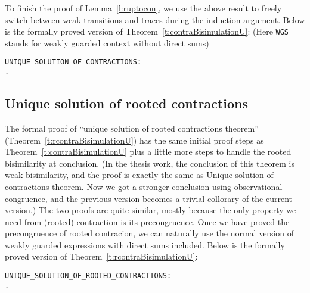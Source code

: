 To finish the proof of Lemma~\ref{l:ruptocon}, we use the  above
result to freely switch between weak transitions and traces
during the induction argument.
Below is the formally proved version of
Theorem~\ref{t:contraBisimulationU}: (Here \texttt{WGS} stands for weakly guarded context without direct
sums)
\begin{alltt}
UNIQUE_SOLUTION_OF_CONTRACTIONS:
\HOLTokenTurnstile{}   \HOLSymConst{\HOLTokenImp{}} \HOLSymConst{\HOLTokenForall{}} .  \HOLSymConst{\HOLTokenContracts{}}   \HOLSymConst{\HOLTokenConj{}}  \HOLSymConst{\HOLTokenContracts{}}   \HOLSymConst{\HOLTokenImp{}}  \HOLSymConst{\HOLTokenWeakEQ} 
\end{alltt}

\subsection{Unique solution of rooted contractions}

The formal proof of ``unique solution of rooted contractions theorem''
(Theorem~\ref{t:rcontraBisimulationU}) has the
same initial proof steps as Theorem~\ref{t:contraBisimulationU} plus a
little more steps to handle the rooted bisimilarity at conclusion. (In the thesis work, the conclusion of this theorem
is weak bisimilarity, and the proof is exactly the same as Unique
solution of contractions theorem. Now we got a stronger conclusion
using observational congruence, and the previous version becomes a
trivial collorary of the current version.) The
two proofs are quite similar, mostly because the only property we need
from (rooted) contraction is its precongruence. Once we have proved
the precongruence of rooted contracion, we can naturally use the
normal version of weakly guarded expressions with direct sums
included. Below is the formally proved version of Theorem~\ref{t:rcontraBisimulationU}:
\begin{alltt}
UNIQUE_SOLUTION_OF_ROOTED_CONTRACTIONS:
\HOLTokenTurnstile{}   \HOLSymConst{\HOLTokenImp{}} \HOLSymConst{\HOLTokenForall{}} .  \HOLSymConst{\HOLTokenObsContracts}   \HOLSymConst{\HOLTokenConj{}}  \HOLSymConst{\HOLTokenObsContracts}   \HOLSymConst{\HOLTokenImp{}}  \HOLSymConst{\HOLTokenObsCongr} 
\end{alltt}
